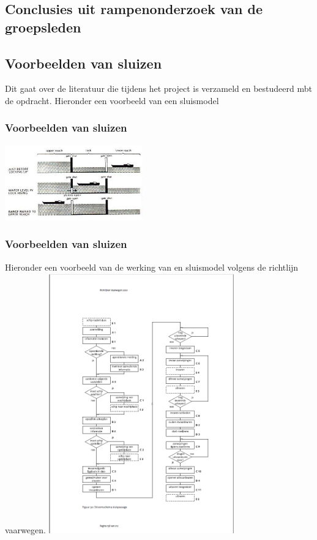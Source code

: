 \documentclass{article}
\begin{document}
	
	
	\subsection{Conclusies uit rampenonderzoek van de groepsleden}
	
	\subsection{Voorbeelden van sluizen}
	Dit gaat over de literatuur die tijdens het project is verzameld en bestudeerd mbt de opdracht.
	Hieronder een voorbeeld van een sluismodel
	
	\subsubsection{Voorbeelden van sluizen}
	\includegraphics[width=6cm]{sluismodel.jpg} %
	
	\subsubsection{Voorbeelden van sluizen}
		Hieronder een voorbeeld van de werking van en sluismodel volgens de richtlijn vaarwegen.
	\includegraphics[width=8cm]{sluispassage.png} %
	
\end{document}
